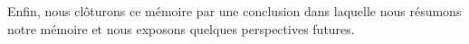 \par Enfin, nous clôturons ce mémoire par une conclusion dans laquelle nous résumons notre mémoire et nous exposons quelques perspectives futures.





















